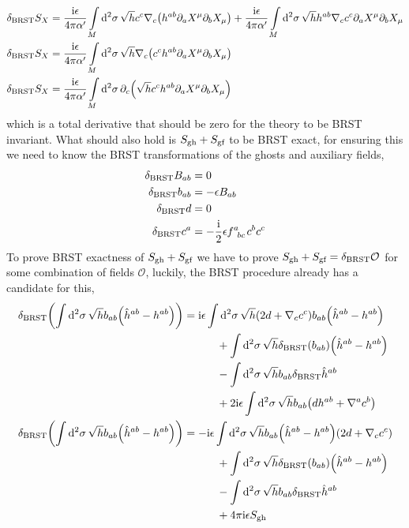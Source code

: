 \begin{align*}
    \delta_{\textnormal{BRST}}S_X&=\frac{\textnormal{i}\epsilon}{4\pi\alpha'}\int\limits_{M}\dd[2]{\sigma}\sqrt{h}c^c\nabla_c\qty(h^{ab}\partial_aX^\mu \partial_bX_\mu)+\frac{\textnormal{i}\epsilon}{4\pi\alpha'}\int\limits_{M}\dd[2]{\sigma}\sqrt{h}h^{ab}\nabla_cc^c\partial_aX^\mu\partial_b X_\mu\\
    \delta_{\textnormal{BRST}}S_X&=\frac{\textnormal{i}\epsilon}{4\pi\alpha'}\int\limits_{M}\dd[2]{\sigma}\sqrt{h}\nabla_c\qty(c^c h^{ab}\partial_aX^\mu \partial_bX_\mu)\\
    \delta_{\textnormal{BRST}}S_X&=\frac{\textnormal{i}\epsilon}{4\pi\alpha'}\int\limits_{M}\dd[2]{\sigma}\partial_c\qty(\sqrt{h}c^c h^{ab}\partial_aX^\mu \partial_bX_\mu)
\end{align*}
which is a total derivative that should be zero for the theory to be BRST invariant. What should also hold is $S_{\textnormal{gh}}+S_{\textnormal{gf}}$ 
to be BRST exact, for ensuring this we need to know the BRST transformations of the ghosts and auxiliary fields,
\begin{align*}
    \delta_{\textnormal{BRST}} B_{ab}&=0\\
    \delta_{\textnormal{BRST}} b_{ab}&=-\epsilon B_{ab}\\
    \delta_{\textnormal{BRST}} d&=0\\
    \delta_{\textnormal{BRST}} c^a&=-\frac\im 2\epsilon \tensor{f}{^a_b_c}c^bc^c
\end{align*}
To prove BRST exactness of $S_{\textnormal{gh}}+S_{\textnormal{gf}}$ we have to prove $S_{\textnormal{gh}}+S_{\textnormal{gf}}=\delta_{\textnormal{BRST}}\mathcal O$ 
for some combination of fields $\mathcal O$, luckily, the BRST procedure already has a candidate for this,
\begin{align*}
    \delta_{\textnormal{BRST}}\qty(\int\dd[2]{\sigma}\sqrt{h}b_{ab}\qty(\hat h^{ab}-h^{ab}))&=\textnormal{i}\epsilon\int\dd[2]{\sigma}\sqrt{h}\qty(2d+\nabla_c c^c)b_{ab}\qty(\hat h^{ab}-h^{ab})\\
    &\quad\quad\quad+\int\dd[2]{\sigma}\sqrt{h}\delta_{\textnormal{BRST}}\qty(b_{ab})\qty(\hat h^{ab}-h^{ab})\\
    &\quad\quad\quad-\int\dd[2]{\sigma}\sqrt{h}b_{ab}\delta_{\textnormal{BRST}}\hat h^{ab}\\
    &\quad\quad\quad+2\textnormal{i}\epsilon\int\dd[2]{\sigma}\sqrt{h}b_{ab}\qty(dh^{ab}+\nabla^{a}c^{b})\\
    \delta_{\textnormal{BRST}}\qty(\int\dd[2]{\sigma}\sqrt{h}b_{ab}\qty(\hat h^{ab}-h^{ab}))&=-\textnormal{i}\epsilon\int\dd[2]{\sigma}\sqrt{h}b_{ab}\qty(\hat h^{ab}-h^{ab})\qty(2d+\nabla_c c^c)\\
    &\quad\quad\quad+\int\dd[2]{\sigma}\sqrt{h}\delta_{\textnormal{BRST}}\qty(b_{ab})\qty(\hat h^{ab}-h^{ab})\\
    &\quad\quad\quad-\int\dd[2]{\sigma}\sqrt{h}b_{ab}\delta_{\textnormal{BRST}}\hat h^{ab}\\
    &\quad\quad\quad+4\pi\textnormal{i}\epsilon S_{\textnormal{gh}}
\end{align*}